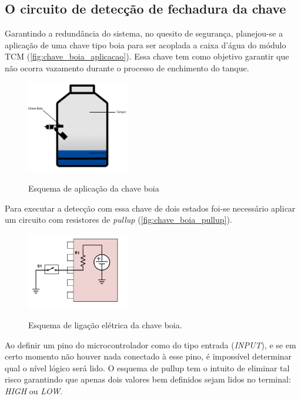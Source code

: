 \subsection{O circuito de detecção de fechadura da chave}

 Garantindo a redundância do sistema, no quesito de segurança, planejou-se a aplicação de uma chave tipo boia para ser acoplada a caixa d'água do módulo TCM (\autoref{fig:chave_boia_aplicacao}). Essa chave tem como objetivo garantir que não ocorra vazamento durante o processo de enchimento do tanque.

\begin{figure}[H]
	\centering
	\caption{Esquema de aplicação da chave boia}
	\includegraphics[width=0.4\textwidth]{figuras/chave_boia_aplicacao.png}
	\label{fig:chave_boia_aplicacao}
\end{figure}

Para executar a detecção com essa chave de dois estados foi-se necessário aplicar um circuito com resistores de \textit{pullup} (\autoref{fig:chave_boia_pullup}).

\begin{figure}[H]
	\centering
	\caption{Esquema de ligação elétrica da chave boia.}
	\includegraphics[width=0.4\textwidth]{figuras/pullup.png}
	\label{fig:chave_boia_pullup}
\end{figure}

 Ao definir um pino do microcontrolador como do tipo entrada (\textit{INPUT}), e se em certo momento não houver nada conectado à esse pino, é impossível determinar qual o nível lógico será lido. O esquema de pullup tem o intuito de eliminar tal risco garantindo que apenas dois valores bem definidos sejam lidos no terminal: \textit{HIGH} ou \textit{LOW}.
 
